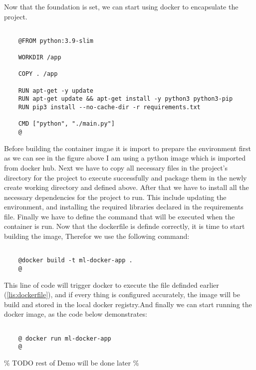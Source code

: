\newline
Now that the foundation is set, we can start using docker to encapsulate the project.

\begin{lstlisting}[label=lis:dockerfile, caption={The structure of a Dockerfile}]

    @FROM python:3.9-slim

    WORKDIR /app

    COPY . /app

    RUN apt-get -y update
    RUN apt-get update && apt-get install -y python3 python3-pip
    RUN pip3 install --no-cache-dir -r requirements.txt
    
    CMD ["python", "./main.py"]
    @
\end{lstlisting}
Before building the container imgae it is import to prepare the environment first as we can see in the figure above I am using a python image which is imported from docker hub.
Next we have to copy all necessary files in the project's directory for the project to execute successfully and package them in the newly create working directory and defined above.
After that we have to install all the necessary dependencies for the project to run. This include updating the environment, and installing the required libraries declared in the requirements file. 
Finally we have to define the command that will be executed when the container is run.
\newline
Now that the dockerfile is definde correctly, it is time to start building the image, Therefor we use the following command:
\begin{lstlisting}[caption={Building docker image}]

    @docker build -t ml-docker-app .
    @
\end{lstlisting}
This line of code will trigger docker to execute the file definded earlier (\autoref{lis:dockerfile}), and if every thing is configured accurately,
the image will be build and stored in the local docker registry.And finally we can start running the docker image, as the code below demonstrates:
\begin{lstlisting}[caption={running the built docker image}]

    @ docker run ml-docker-app
    @
\end{lstlisting}
\begin{center}
    \% TODO rest of Demo will be done later \%
\end{center}

